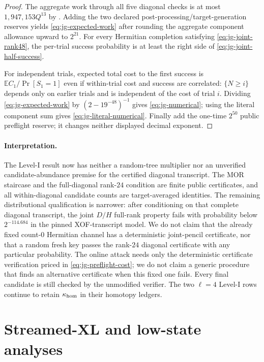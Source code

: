 \documentclass[11pt]{article}
\begin{document}
\begin{proof}
The aggregate work through all five diagonal checks is at most
$1{,}947{,}153Q^{13}$ by
.  Adding the
two declared post-processing/target-generation reserves yields
\eqref{eq:jg-expected-work} after rounding the aggregate component allowance
upward to $2^{21}$.  For every Hermitian completion satisfying \eqref{eq:jg-joint-rank48}, the
per-trial success probability is at least the right side of
\eqref{eq:jg-joint-half-success}.

For independent trials, expected total cost to the first success is
$\mathbb EC_1/\Pr[S_1=1]$ even if within-trial cost and success are correlated:
$\{N\ge i\}$ depends only on earlier trials and is independent of the cost of
trial $i$.  Dividing \eqref{eq:jg-expected-work} by
$(2-19^{-48})^{-1}$ gives \eqref{eq:jg-numerical}; using the literal component
sum gives \eqref{eq:jg-literal-numerical}.  Finally add the one-time $2^{50}$
public preflight reserve; it changes neither displayed decimal exponent.
\end{proof}

\paragraph{Interpretation.}
The Level-I result now has neither a random-tree multiplier nor an unverified
candidate-abundance premise for the certified diagonal transcript.  The MOR
staircase and the full-diagonal rank-$24$ condition are finite public
certificates, and all within-diagonal candidate counts are target-averaged
identities.  The remaining distributional qualification is narrower: after
conditioning on that complete diagonal transcript, the joint $D/H$ full-rank
property fails with probability below $2^{-114.684}$ in the pinned
XOF-transcript model.  We do not claim that the already fixed count-$0$
Hermitian channel has a deterministic joint-pencil certificate, nor that a
random fresh key passes the rank-$24$ diagonal certificate with any particular
probability.  The online attack
needs only the deterministic certificate verification priced in
\eqref{eq:jg-preflight-cost}; we do not claim a generic procedure that finds an
alternative certificate when this fixed one fails.  Every final candidate is
still checked by the unmodified verifier.  The two $\ell=4$ Level-I rows
continue to retain $\kappa_{\rm hom}$ in their homotopy ledgers.

\section{Streamed-XL and low-state analyses}
\label{sec:low-state-xl}
\end{document}
